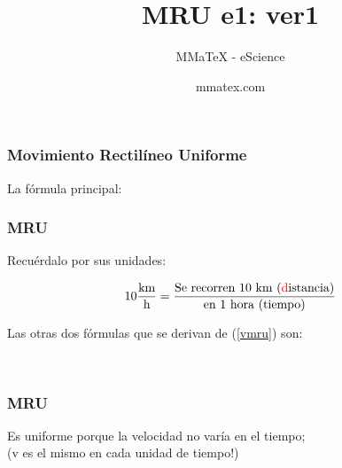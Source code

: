 \documentclass{beamer}
\title{MRU e1: ver1}
\subtitle{MMaTeX - eScience}
\author{mmatex.com}
\newcommand{\red}[1]{\textcolor{red}{#1}}
\begin{document}
\maketitle


\begin{frame}
\frametitle{Movimiento Rectil\'ineo Uniforme}
La f\'ormula principal:

{\huge \vmru}

\vNUa
\end{frame}

\begin{frame}
\frametitle{MRU}
Recu\'erdalo por sus unidades:

\begin{equation*}
10\frac{\text{km}}{\text{h}} =
\frac{\text{Se recorren 10 km ({\red distancia})}}
{\text{en 1 hora ({tiempo})}}
\end{equation*}

Las otras dos f\'ormulas que se derivan de (\ref{vmru}) son:

{\large \xmru \\ \tmru}
\end{frame}

\begin{frame}
\frametitle{MRU}
Es uniforme porque la velocidad no var\'ia en el tiempo; \\
(v es el mismo en cada unidad de tiempo!)

\begin{center}
\end{center}
\end{frame}
\end{document}
